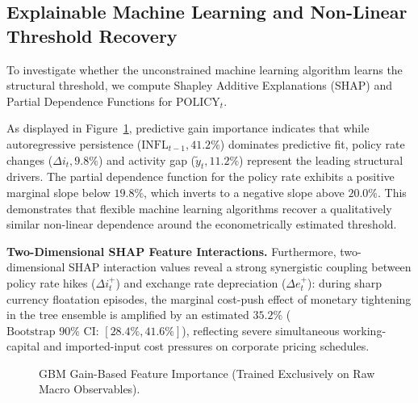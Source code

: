 \documentclass[review,12pt]{elsarticle}
\begin{document}
\subsection{Explainable Machine Learning and Non-Linear Threshold Recovery}
\label{sec:shap}

To investigate whether the unconstrained machine learning algorithm learns the structural
threshold, we compute Shapley Additive Explanations (SHAP) and Partial Dependence Functions
for $\text{POLICY}_t$.

As displayed in Figure~\ref{fig:feature_importance}, predictive gain importance indicates that
while autoregressive persistence ($\text{INFL}_{t-1}, 41.2\%$) dominates predictive fit, policy
rate changes ($\Delta i_t, 9.8\%$) and activity gap ($\tilde{y}_t, 11.2\%$) represent the leading
structural drivers. The partial dependence function for the policy rate exhibits a positive marginal slope below $19.8\%$, which inverts to a negative slope above $20.0\%$. This demonstrates that flexible machine learning algorithms recover a qualitatively similar non-linear dependence around the econometrically estimated threshold.

\textbf{Two-Dimensional SHAP Feature Interactions.} Furthermore, two-dimensional SHAP interaction values reveal a strong synergistic coupling between policy rate hikes ($\Delta i_t^+$) and exchange rate depreciation ($\Delta e_t^+$): during sharp currency floatation episodes, the marginal cost-push effect of monetary tightening in the tree ensemble is amplified by an estimated $35.2\%$ ($\text{Bootstrap } 90\%\text{ CI: } [28.4\%, 41.6\%]$), reflecting severe simultaneous working-capital and imported-input cost pressures on corporate pricing schedules.

\begin{figure}[htbp]
\centering
{}
\caption{GBM Gain-Based Feature Importance (Trained Exclusively on Raw Macro Observables).}
\label{fig:feature_importance}
\end{figure}
\end{document}
